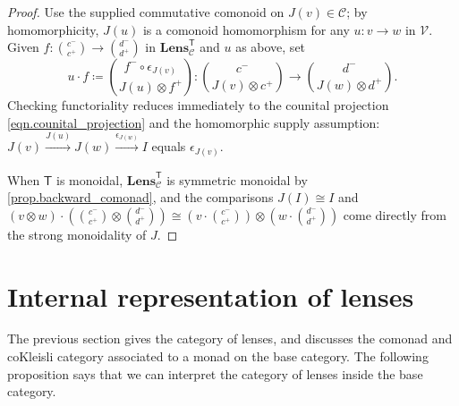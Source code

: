 \documentclass[11pt, oneside, article]{memoir}
\theoremstyle{definition}
\theoremstyle{plain}
\newcommand{\cat}[1]{\mathcal{#1}}%
\newcommand{\Cat}[1]{\mathbf{#1}}%
\newcommand{\Fun}[1]{\mathsf{#1}}%
\newcommand{\To}[2][]{\xrightarrow[#1]{#2}}
\newcommand{\Lens}[1]{\Cat{Lens}_{#1}}
\newcommand{\inpt}[1]{#1^{-}}
\newcommand{\outp}[1]{#1^{+}}
\newcommand{\lensob}[1]{\binom{\inpt{#1}}{\outp{#1}}}%
\begin{document}
\begin{proof}
Use the supplied commutative comonoid on $J(v)\in\cat C$; by homomorphicity, $J(u)$ is a comonoid homomorphism for any $u\colon v\to w$ in $\cat V$. Given $f\colon\lensob c\to\lensob d$ in $\Lens{\cat C}^{\Fun T}$ and $u$ as above, set
\[
u\cdot f\coloneqq\binom{\inpt f\circ\epsilon_{J(v)}}{J(u)\otimes\outp f}\colon
\binom{\inpt c}{J(v)\otimes\outp c}
\to
\binom{\inpt d}{J(w)\otimes\outp d}.
\]
Checking functoriality reduces immediately to the counital projection \eqref{eqn.counital_projection} and the homomorphic supply assumption: $J(v)\To{J(u)}J(w)\To{\epsilon_{J(w)}} I$ equals $\epsilon_{J(v)}$.

When $\Fun T$ is monoidal, $\Lens{\cat C}^{\Fun T}$ is symmetric monoidal by \cref{prop.backward_comonad}, and the comparisons $J(I)\cong I$ and $(v\otimes w)\cdot(\lensob c\otimes\lensob d)\cong(v\cdot\lensob c)\otimes(w\cdot\lensob d)$ come directly from the strong monoidality of $J$.
\end{proof}

\section{Internal representation of lenses}\label{sec.abstract_representation}

The previous section gives the category of lenses, and discusses the comonad and coKleisli category associated to a monad on the base category. The following proposition says that we can interpret the category of lenses inside the base category.
\end{document}
